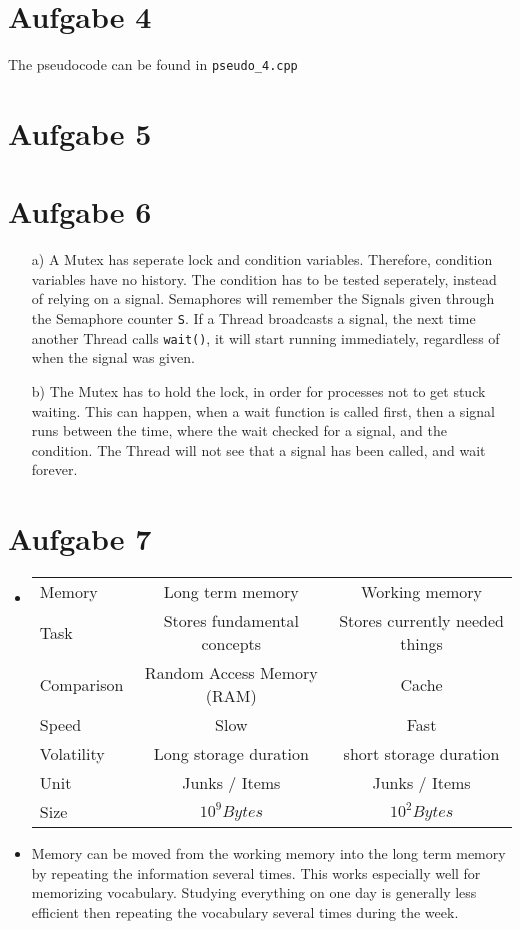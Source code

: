 \documentclass{article}
\begin{document}
\section*{Aufgabe 4}
The pseudocode can be found in \texttt{pseudo\_4.cpp} \\
\section*{Aufgabe 5}
\section*{Aufgabe 6}
\begin{itemize}
    \item[a)]
	A Mutex has seperate lock and condition variables. Therefore, condition
	variables have no history. The condition has to be tested seperately,
	instead of relying on a signal.
	Semaphores will remember the Signals given through the Semaphore counter
	\verb=S=. If a Thread broadcasts a signal, the next time another Thread
	calls \verb=wait()=, it will start running immediately, regardless
	of when the signal was given.
    \item[b)]
	The Mutex has to hold the lock, in order for processes not to get stuck
	waiting. This can happen, when a wait function is called first, then a
	signal runs between the time, where the wait checked for a signal, and
	the condition. The Thread will not see that a signal has been called,
	and wait forever.
\end{itemize}

\section*{Aufgabe 7}
\begin{itemize}
    \item 
\begin{table}[H]
    \centering
    \begin{tabular}{lcc}
	\toprule
	Memory & Long term memory & Working memory \\
	Task & Stores fundamental concepts & Stores currently needed things \\ \midrule
	Comparison & Random Access Memory (RAM) & Cache \\
	Speed & Slow & Fast \\
	Volatility & Long storage duration & short storage duration \\
	Unit & Junks / Items & Junks / Items \\
	Size & \( 10 ^{9} Bytes\) & \( 10 ^{2} Bytes \) \\
	\bottomrule
    \end{tabular}
\end{table}
\item Memory can be moved from the working memory into the long term memory by
    repeating the information several times. This works especially well for
    memorizing vocabulary. Studying everything on one day is generally less efficient
    then repeating the vocabulary several times during the week.
\end{itemize}
\end{document}
